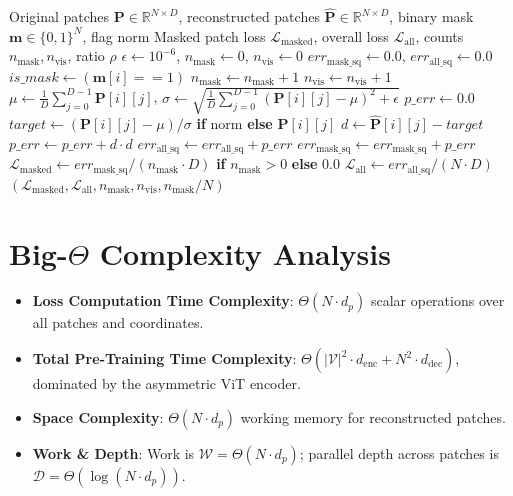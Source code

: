 \documentclass[11pt,a4paper]{article}
\theoremstyle{definition}
\begin{document}
\begin{algorithm}[H]
\caption{Masked Autoencoder Patch Normalization and Masked Reconstruction Loss}
\begin{algorithmic}[1]
\Require Original patches $\mathbf{P} \in \mathbb{R}^{N \times D}$, reconstructed patches $\hat{\mathbf{P}} \in \mathbb{R}^{N \times D}$, binary mask $\mathbf{m} \in \{0, 1\}^N$, flag $\text{norm}$
\Ensure Masked patch loss $\mathcal{L}_{\text{masked}}$, overall loss $\mathcal{L}_{\text{all}}$, counts $n_{\text{mask}}, n_{\text{vis}}$, ratio $\rho$
\State $\epsilon \gets 10^{-6}$, \quad $n_{\text{mask}} \gets 0$, \quad $n_{\text{vis}} \gets 0$
\State $err_{\text{mask\_sq}} \gets 0.0$, \quad $err_{\text{all\_sq}} \gets 0.0$
    \State $is\_mask \gets (\mathbf{m}[i] == 1)$
     \State $n_{\text{mask}} \gets n_{\text{mask}} + 1$ \Else \State $n_{\text{vis}} \gets n_{\text{vis}} + 1$ \EndIf
        \State $\mu \gets \frac{1}{D}\sum_{j=0}^{D-1} \mathbf{P}[i][j]$, \quad $\sigma \gets \sqrt{\frac{1}{D}\sum_{j=0}^{D-1} (\mathbf{P}[i][j] - \mu)^2 + \epsilon}$
    \EndIf
    \State $p\_err \gets 0.0$
        \State $target \gets (\mathbf{P}[i][j] - \mu) / \sigma$ \textbf{if} $\text{norm}$ \textbf{else} $\mathbf{P}[i][j]$
        \State $d \gets \hat{\mathbf{P}}[i][j] - target$
        \State $p\_err \gets p\_err + d \cdot d$
    \EndFor
    \State $err_{\text{all\_sq}} \gets err_{\text{all\_sq}} + p\_err$
     \State $err_{\text{mask\_sq}} \gets err_{\text{mask\_sq}} + p\_err$ \EndIf
\EndFor
\State $\mathcal{L}_{\text{masked}} \gets err_{\text{mask\_sq}} / (n_{\text{mask}} \cdot D)$ \textbf{if} $n_{\text{mask}} > 0$ \textbf{else} $0.0$
\State $\mathcal{L}_{\text{all}} \gets err_{\text{all\_sq}} / (N \cdot D)$
\State \Return $(\mathcal{L}_{\text{masked}}, \mathcal{L}_{\text{all}}, n_{\text{mask}}, n_{\text{vis}}, n_{\text{mask}} / N)$
\end{algorithmic}
\end{algorithm}

\section{Big-$\Theta$ Complexity Analysis}

\begin{itemize}
    \item \textbf{Loss Computation Time Complexity}: $\Theta(N \cdot d_p)$ scalar operations over all patches and coordinates.
    \item \textbf{Total Pre-Training Time Complexity}: $\Theta(|\mathcal{V}|^2 \cdot d_{\text{enc}} + N^2 \cdot d_{\text{dec}})$, dominated by the asymmetric ViT encoder.
    \item \textbf{Space Complexity}: $\Theta(N \cdot d_p)$ working memory for reconstructed patches.
    \item \textbf{Work \& Depth}: Work is $\mathcal{W} = \Theta(N \cdot d_p)$; parallel depth across patches is $\mathcal{D} = \Theta(\log(N \cdot d_p))$.
\end{itemize}
\end{document}
